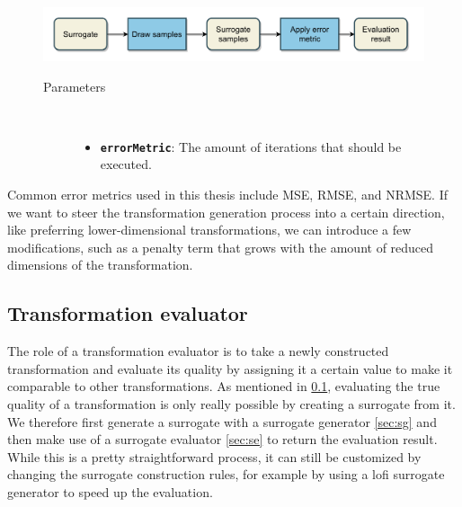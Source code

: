 \documentclass[
  a4paper,  %
  twoside,  %
  bibliography=totoc,
  headsepline,
  cleardoublepage=empty,
  parskip=half,
  draft=false
]{scrbook}
\begin{document}
\begin{mdframed}[style=style,frametitle={Surrogate evaluator}]
\begin{figure}[H]
\includegraphics[width=\textwidth]{graphics/SurrogateEval.pdf}
\vspace{-4.5mm}

\delimit

\begin{description}
\item[Parameters] {~ \begin{itemize}[\indent{}]
\item \texttt{\textbf{errorMetric}}: The amount of iterations that should be executed.
\end{itemize}}
\end{description}

\delimit

\label{fig:se}
\end{figure}
\end{mdframed}

Common error metrics used in this thesis include MSE, RMSE, and NRMSE.
If we want to steer the transformation generation process into a certain direction, like preferring lower-dimensional transformations, we can introduce a few modifications, such as a penalty term that grows with the amount of reduced dimensions of the transformation.

\subsection {Transformation evaluator}
\label{sec:te}

The role of a transformation evaluator is to take a newly constructed transformation and evaluate its quality by assigning it a certain value to make it comparable to other transformations.
As mentioned in \cref{sec:te}, evaluating the true quality of a transformation is only really possible by creating a surrogate from it.
We therefore first generate a surrogate with a surrogate generator \cref{sec:sg} and then make use of a surrogate evaluator \cref{sec:se} to return the evaluation result.
While this is a pretty straightforward process, it can still be customized by changing the surrogate construction rules, for example by using a lofi surrogate generator to speed up the evaluation.
\end{document}
